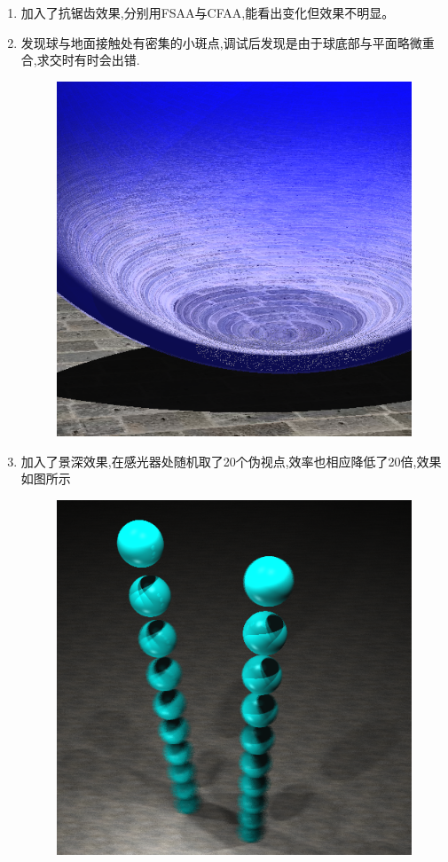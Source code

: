 \begin{enumerate}
\item 加入了抗锯齿效果,分别用FSAA与CFAA,能看出变化但效果不明显。

\item 发现球与地面接触处有密集的小斑点,调试后发现是由于球底部与平面略微重合,求交时有时会出错.
\begin{figure}[H]
  \centering
  \includegraphics[scale=0.4]{res/smallpoint.png}
\end{figure}

\item 加入了景深效果,在感光器处随机取了20个伪视点,效率也相应降低了20倍,效果如图所示
\begin{figure}[H]
  \centering
  \includegraphics[scale=0.4]{res/dof.png}
  \caption{\label{fig:dof}}
\end{figure}


\end{enumerate}
